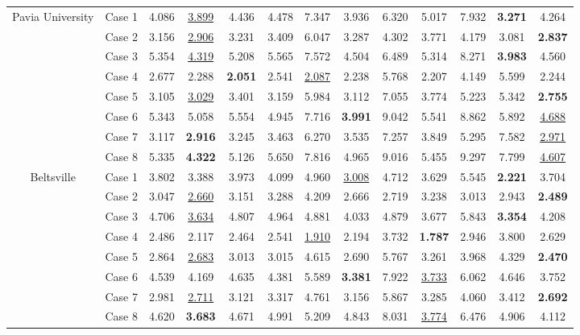 \begin{table*}[t]
\begin{center}
{\begin{tabular}{cc ccccccccccc}
				\multirow{8}{*}{Pavia University} 
				& Case 1 & 
				4.086 & \underline{3.899} & 4.436 & 4.478 & 7.347 & 3.936 & 6.320 & 5.017 & 7.932 & \textbf{3.271} & 4.264 \\ 
				& Case 2 & 
				3.156 & \underline{2.906} & 3.231 & 3.409 & 6.047 & 3.287 & 4.302 & 3.771 & 4.179 & 3.081 & \textbf{2.837} \\ 
				& Case 3 & 
				5.354 & \underline{4.319} & 5.208 & 5.565 & 7.572 & 4.504 & 6.489 & 5.314 & 8.271 & \textbf{3.983} & 4.560 \\ 
				& Case 4 & 
				2.677 & 2.288 & \textbf{2.051} & 2.541 & \underline{2.087} & 2.238 & 5.768 & 2.207 & 4.149 & 5.599 & 2.244 \\ 
				& Case 5 & 
				3.105 & \underline{3.029} & 3.401 & 3.159 & 5.984 & 3.112 & 7.055 & 3.774 & 5.223 & 5.342 & \textbf{2.755} \\ 
				& Case 6 & 
				5.343 & 5.058 & 5.554 & 4.945 & 7.716 & \textbf{3.991} & 9.042 & 5.541 & 8.862 & 5.892 & \underline{4.688} \\ 
				& Case 7 & 
				3.117 & \textbf{2.916} & 3.245 & 3.463 & 6.270 & 3.535 & 7.257 & 3.849 & 5.295 & 7.582 & \underline{2.971} \\ 
				& Case 8 & 
				5.335 & \textbf{4.322} & 5.126 & 5.650 & 7.816 & 4.965 & 9.016 & 5.455 & 9.297 & 7.799 & \underline{4.607} \\ 
				
				\cmidrule(lr){1-13} 
				
				\multirow{8}{*}{Beltsville} 
				& Case 1 & 
				3.802 & 3.388 & 3.973 & 4.099 & 4.960 & \underline{3.008} & 4.712 & 3.629 & 5.545 & \textbf{2.221} & 3.704 \\ 
				& Case 2 & 
				3.047 & \underline{2.660} & 3.151 & 3.288 & 4.209 & 2.666 & 2.719 & 3.238 & 3.013 & 2.943 & \textbf{2.489} \\ 
				& Case 3 & 
				4.706 & \underline{3.634} & 4.807 & 4.964 & 4.881 & 4.033 & 4.879 & 3.677 & 5.843 & \textbf{3.354} & 4.208 \\ 
				& Case 4 & 
				2.486 & 2.117 & 2.464 & 2.541 & \underline{1.910} & 2.194 & 3.732 & \textbf{1.787} & 2.946 & 3.800 & 2.629 \\ 
				& Case 5 & 
				2.864 & \underline{2.683} & 3.013 & 3.015 & 4.615 & 2.690 & 5.767 & 3.261 & 3.968 & 4.329 & \textbf{2.470} \\ 
				& Case 6 & 
				4.539 & 4.169 & 4.635 & 4.381 & 5.589 & \textbf{3.381} & 7.922 & \underline{3.733} & 6.062 & 4.646 & 3.752 \\ 
				& Case 7 & 
				2.981 & \underline{2.711} & 3.121 & 3.317 & 4.761 & 3.156 & 5.867 & 3.285 & 4.060 & 3.412 & \textbf{2.692} \\ 
				& Case 8 & 
				4.620 & \textbf{3.683} & 4.671 & 4.991 & 5.209 & 4.843 & 8.031 & \underline{3.774} & 6.476 & 4.906 & 4.112 \\ 
				
				\bottomrule
			\end{tabular}
				
		}
	\end{center}
\end{table*}